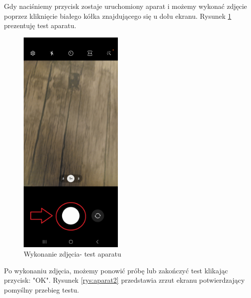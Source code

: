 \newpage


Gdy naciśniemy przycisk zostaje uruchomiony aparat i możemy wykonać zdjęcie poprzez kliknięcie białego kółka znajdującego się u dołu ekranu.
Rysunek \ref{rys:aparat1} prezentuję test aparatu.

\begin{figure}[!hbt]
	\begin{center}
		\includegraphics[angle=360, width=0.45\textwidth]{rys/punkt6/aparat1}
		\caption{Wykonanie zdjęcia- test aparatu}
		\label{rys:aparat1}
	\end{center}
\end{figure}

\newpage


Po wykonaniu zdjęcia, możemy ponowić próbę lub zakończyć test klikając przycisk: "OK". Rysunek \ref{rys:aparat2} przedstawia zrzut ekranu potwierdzający pomyślny przebieg testu.

